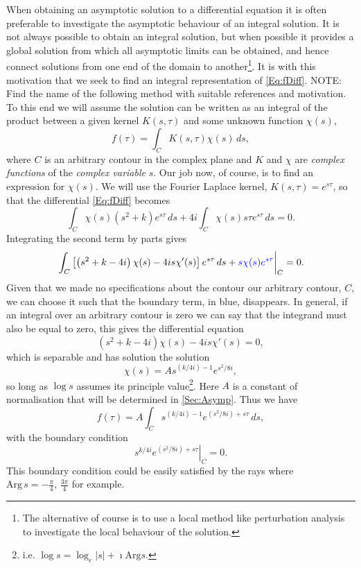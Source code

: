 When obtaining an asymptotic solution to a differential equation it is often preferable to investigate the asymptotic behaviour of an integral solution. 
It is not always possible to obtain an integral solution, but when possible it provides a global solution from which all asymptotic limits can be obtained, and hence connect solutions from one end of the domain to another\footnote{The alternative of course is to use a local method like perturbation analysis to investigate the local behaviour of the solution.}. 
It is with this motivation that we seek to find an integral representation of \autoref{Eq:fDiff}. 
NOTE: Find the name of the following method with suitable references and motivation.
To this end we will assume the solution can be written as an integral of the product between a given kernel $K(s,\tau)$ and some unknown function\cite{White2005} $\chi(s)$,
\begin{equation}
	f(\tau) = \int_{C} K(s,\tau) \chi(s) \, ds,
\end{equation}
where $C$ is an arbitrary contour in the complex plane and $K$ and $\chi$ are \emph{complex functions} of the \emph{complex variable} $s$. 
Our job now, of course, is to find an expression for $\chi(s)$.
We will use the Fourier Laplace kernel, $K(s,\tau) = e^{s\tau}$, so that the differential \autoref{Eq:fDiff} becomes
\begin{equation}
	\int_{C}\chi(s) \left(s^{2}+k\right)e^{s\tau}\, ds + 4i\int_{C}\chi(s)s\tau e^{s\tau} \, ds = 0.
\end{equation}
Integrating the second term by parts gives
\begin{equation}
	\left.\int_{C}\left[\left(s^{2}+k-4i\right)\chi(s) - 4is \chi'(s)\right] e^{s\tau}\, ds + \textcolor{blue}{s\chi(s)e^{s\tau}}\right\vert_{C} = 0.
\end{equation}
Given that we made no specifications about the contour our arbitrary contour, $C$, we can choose it such that the boundary term, in blue, disappears. 
In general, if an integral over an arbitrary contour is zero we can say that the integrand must also be equal to zero, this gives the differential equation
\begin{equation}
	\left(s^{2}+k-4i\right)\chi(s) - 4is \chi'(s) = 0,
\end{equation}
which is separable and has solution the solution
\begin{equation}
	\chi(s) = As^{(k/4i) - 1}e^{s^{2}/8i},
\end{equation}
so long as $\log s$ assumes its principle value\footnote{i.e. $\log s = \log_e \vert s \vert + \imath \text{Arg}s$.}. 
Here $A$ is a constant of normalisation that will be determined in \autoref{Sec:Asymp}. 
Thus we have 
\begin{equation}
	f(\tau) = A\int_{C}s^{(k/4i)-1}e^{(s^{2}/8i)+s\tau}\, ds, \label{Eq:AsymInt}
\end{equation}
with the boundary condition
\begin{equation}
	\left.s^{k/4i}e^{(s^{2}/8i)+s\tau}\right\vert_{C}=0.
\end{equation}
This boundary condition could be easily satisfied by the rays where $\text{Arg} \,s = -\frac{\pi}{4}, \, \frac{3\pi}{4}$ for example.

